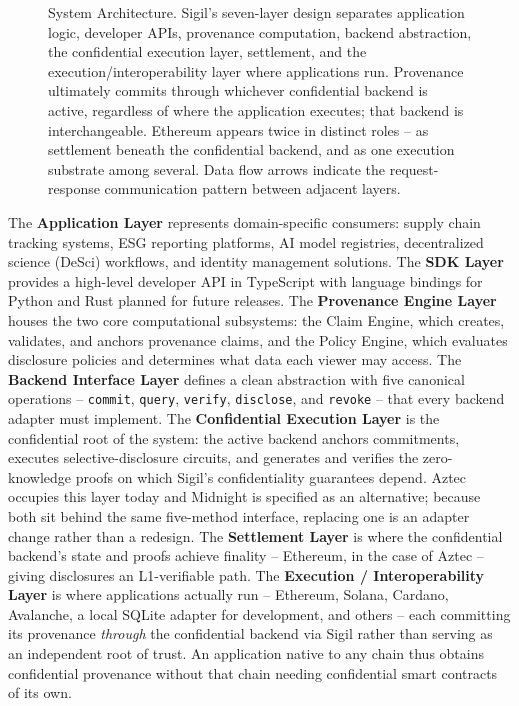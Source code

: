 \documentclass[conference]{IEEEtran}
\begin{document}
\begin{figure}[t]
\begin{tikzpicture}
\end{tikzpicture}
\caption{System Architecture. Sigil's seven-layer design separates application
  logic, developer APIs, provenance computation, backend abstraction, the
  confidential execution layer, settlement, and the execution/interoperability
  layer where applications run.  Provenance ultimately commits through whichever
  confidential backend is active, regardless of where the application executes;
  that backend is interchangeable.  Ethereum appears twice in distinct roles --
  as settlement beneath the confidential backend, and as one execution substrate
  among several.  Data flow arrows indicate the request-response communication
  pattern between adjacent layers.}
\label{fig:layers}
\end{figure}

The \textbf{Application Layer} represents domain-specific consumers: supply
chain tracking systems, ESG reporting platforms, AI model registries,
decentralized science (DeSci) workflows, and identity management solutions.
The \textbf{SDK Layer} provides a high-level developer API in TypeScript with
language bindings for Python and Rust planned for future releases. The
\textbf{Provenance Engine Layer} houses the two core computational
subsystems: the Claim Engine, which creates, validates, and anchors provenance
claims, and the Policy Engine, which evaluates disclosure policies and
determines what data each viewer may access. The \textbf{Backend Interface
Layer} defines a clean abstraction with five canonical operations --
\texttt{commit}, \texttt{query}, \texttt{verify}, \texttt{disclose}, and
\texttt{revoke} -- that every backend adapter must implement. The
\textbf{Confidential Execution Layer} is the confidential root of the system:
the active backend anchors commitments, executes selective-disclosure circuits,
and generates and verifies the zero-knowledge proofs on which Sigil's
confidentiality guarantees depend.  Aztec occupies this layer today and Midnight
is specified as an alternative; because both sit behind the same five-method
interface, replacing one is an adapter change rather than a redesign.  The
\textbf{Settlement Layer} is where the confidential backend's state and proofs
achieve finality -- Ethereum, in the case of Aztec -- giving disclosures an
L1-verifiable path. The \textbf{Execution / Interoperability
Layer} is where applications actually run -- Ethereum, Solana, Cardano,
Avalanche, a local SQLite adapter for development, and others -- each committing
its provenance \emph{through} the confidential backend via Sigil rather than
serving as an independent root of trust. An application native to any chain thus
obtains confidential provenance without that chain needing confidential
smart contracts of its own.
\end{document}
